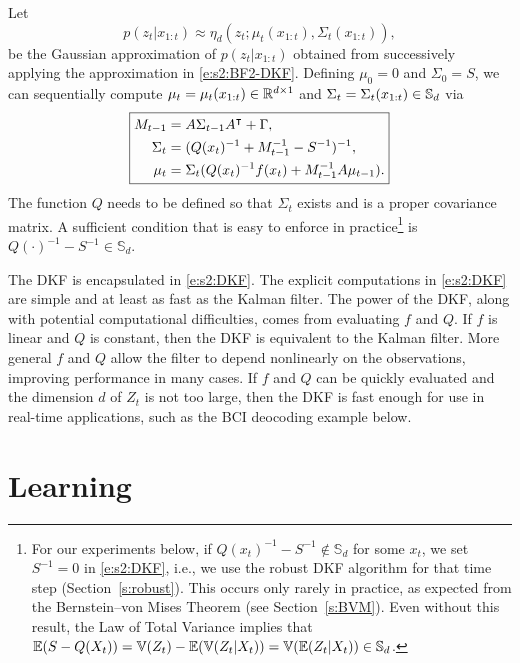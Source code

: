 Let 
\begin{equation}\label{e:s2:DKp} p(z_t|x_{1:t}) \approx \eta_d(z_t;\mu_t(x_{1:t}),\Sigma_t(x_{1:t})) , \end{equation}
be the Gaussian approximation of $p(z_t|x_{1:t})$ obtained from successively applying the approximation in \eqref{e:s2:BF2-DKF}. Defining $\mu_0=0$ and $\Sigma_0=S$, we can sequentially compute $\mu_t=\mu_t(x_{1:t})\in\mathbb{R}^{d\times 1}$ and $\Sigma_t=\Sigma_t(x_{1:t})\in\mathbb{S}_d$ via
\begin{equation} 
\label{e:s2:DKF} 
\boxed{
\begin{aligned}  
M_{t-1} &= A\Sigma_{t-1}A^\intercal+\Gamma , \\
\Sigma_t & = (Q(x_t)^{-1}+M_{t-1}^{-1}-S^{-1})^{-1} ,  \\
\mu_t & = \Sigma_t(Q(x_t)^{-1}f(x_t) + M_{t-1}^{-1}A\mu_{t-1}) .
\end{aligned} 
}
\end{equation}
The function $Q$ needs to be defined so that $\Sigma_t$ exists and is a proper covariance matrix.  A sufficient condition that is easy to enforce in practice\footnote{\label{fn:kludge}For our experiments below, if $Q(x_t)^{-1}-S^{-1}\not\in\mathbb{S}_d$ for some $x_t$, we set $S^{-1}=0$ in \eqref{e:s2:DKF}, i.e., we use the robust DKF algorithm for that time step (Section~\ref{s:robust}). This occurs only rarely in practice, as expected from the Bernstein--von Mises Theorem (see Section~\ref{s:BVM}). Even without this result, the Law of Total Variance implies that $\mathbb{E}(S-Q(X_t)) = \operatorname{\mathbb{V}}(Z_t) - \mathbb{E}(\operatorname{\mathbb{V}}(Z_t|X_t)) = \operatorname{\mathbb{V}}(\mathbb{E}(Z_t|X_t))\in\mathbb{S}_d$.} is $Q(\cdot)^{-1}-S^{-1}\in\mathbb{S}_d$.

The DKF is encapsulated in \eqref{e:s2:DKF}. The explicit computations in \eqref{e:s2:DKF} are simple and at least as fast as the Kalman filter. The power of the DKF, along with potential computational difficulties, comes from evaluating $f$ and $Q$. If $f$ is linear and $Q$ is constant, then the DKF is equivalent to the Kalman filter. More general $f$ and $Q$ allow the filter to depend nonlinearly on the observations, improving performance in many cases. If $f$ and $Q$ can be quickly evaluated and the dimension $d$ of $Z_t$ is not too large, then the DKF is fast enough for use in real-time applications, such as the BCI deocoding example below.

\section{Learning} \label{s:learning} 

